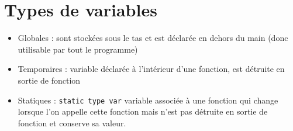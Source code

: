     \section*{Types de variables}
        \begin{itemize}
            \item Globales : sont stockées sous le tas et est déclarée en dehors du main (donc utilisable par tout le programme)
            \item Temporaires : variable déclarée à l'intérieur d'une fonction, est détruite en sortie de fonction
            \item Statiques : \texttt{static type var} variable associée à une fonction qui change lorsque l'on appelle cette fonction mais n'est pas détruite en sortie de fonction et conserve sa valeur.
        \end{itemize}
